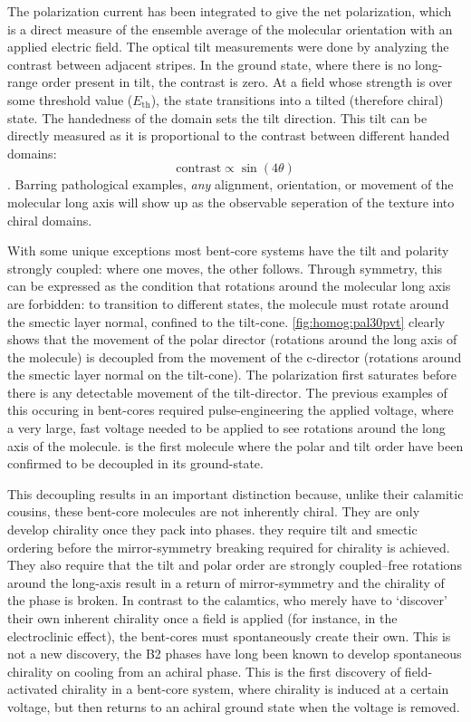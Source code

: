\documentclass[aagreenthesis]{subfiles}
\begin{document}
The polarization current has been integrated to give the net polarization, which
is a direct measure of the ensemble average of the molecular orientation with an
applied electric field. The optical tilt measurements were done by analyzing the
contrast between adjacent stripes. In the ground
state, where there is no long-range order present in tilt, the contrast is zero.
At a field whose strength is over some threshold value ($E_\textrm{th}$), the
state transitions into a tilted (therefore chiral) state. The handedness of the
domain sets the tilt direction. This tilt can be directly measured as it is
proportional to the contrast between different handed domains:
\begin{equation}
    \textrm{contrast}\propto \sin(4\theta)
\end{equation}.
Barring pathological examples, \textit{any} alignment, orientation, or movement
of the molecular long axis will show up as the observable seperation of the
texture into chiral domains. 


With some unique exceptions\cite{michi}
most bent-core systems have the tilt and
polarity strongly coupled: where one moves, the other follows. Through symmetry,
this can be expressed as the condition that rotations around the molecular long
axis are forbidden: to transition to different states, the molecule must rotate
around the smectic layer normal, confined to the tilt-cone.
\autoref{fig:homog:pal30pvt} clearly shows that the movement of the polar
director (rotations around the long axis of the molecule) is decoupled from the
movement of the c-director (rotations around the smectic layer normal on the
tilt-cone). The polarization first saturates
before there is any detectable movement of the tilt-director. The previous
examples of this occuring in bent-cores required pulse-engineering the applied
voltage,
where a very large, fast voltage needed to be applied to see rotations around
the long axis of the molecule. \nfour{} is the first molecule where the polar
and tilt order have been confirmed to be decoupled in its ground-state.

This decoupling results in 
an important distinction because, unlike their calamitic cousins, these
bent-core molecules are not inherently chiral. They are only develop chirality
once they pack into phases. they require tilt and smectic ordering
before the mirror-symmetry breaking required for chirality is achieved. They
also require that the tilt and polar order are strongly coupled--free rotations
around the long-axis result in a return of mirror-symmetry and the chirality of
the phase is broken. In contrast to the calamtics, who merely have to `discover'
their own inherent chirality once a field is applied (for instance, in the
electroclinic effect), the bent-cores must spontaneously create their own. This
is not a new discovery, the B2 phases\cite{link_spontaneous_1997} have long been
known to develop spontaneous chirality on cooling from an achiral phase. This is
the first discovery of field-activated chirality in a bent-core system, where
chirality is induced at a certain voltage, but then returns to an achiral ground
state when the voltage is removed.
\end{document}
